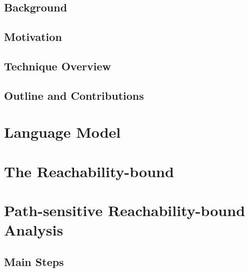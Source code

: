 \documentclass[12pt, letterpaper]{report}   %
\begin{document}
\section{Background}
\label{sec:reachability-background}


\section{Motivation}
\label{sec:reachability-motivation}


\section{Technique Overview}
\label{sec:reachability-overview}


\section{Outline and Contributions}
\label{sec:reachability-outline}



\chapter{{Language Model}}
\label{sec:psRB-language}

\chapter{{The Reachability-bound}}
\label{sec:psRB-definition}



\chapter{Path-sensitive Reachability-bound Analysis}
\label{sec:psRB-analysis-alg}
% 

\section{Main Steps}
\label{sec:psRB-preface}

\end{document}
